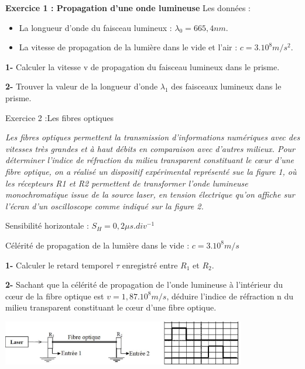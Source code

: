 \documentclass[12pt, french]{article}
\begin{document}
\begin{Box2}{\textbf{Exercice 1 : Propagation d’une onde lumineuse }}
Les données :

\begin{itemize}
	\item La longueur d’onde du faisceau lumineux : $\lambda_0=665,4nm$.

	\item La vitesse de propagation de la lumière dans le vide et l’air : $c=3.10^8m/s^2$.
\end{itemize}

\textbf{1- }Calculer la vitesse v de propagation du faisceau lumineux dans le prisme.

\textbf{2- }Trouver la valeur de la longueur d’onde $\lambda_1$ des faisceaux lumineux dans le prisme.

\end{Box2}
\begin{Box2}{Exercice 2 :Les fibres optiques  }

	\emph{Les fibres optiques permettent la transmission d’informations numériques avec des vitesses très
grandes et à haut débits en comparaison avec d’autres milieux.
Pour déterminer l’indice de réfraction du milieu transparent constituant le cœur d’une fibre optique,
on a réalisé un dispositif expérimental représenté sue la figure 1, où les récepteurs R1 et R2 permettent
de transformer l’onde lumineuse monochromatique issue de la source laser, en tension électrique qu’on
affiche sur l’écran d’un oscilloscope comme indiqué sur la figure 2.}

Sensibilité horizontale : $S_H = 0,2 \mu{s}.div^{-1}$

Célérité de propagation de la lumière dans le vide : $c = 3.10^8 m/s$ 

\textbf{1- }Calculer le retard temporel $\tau$ enregistré entre $R_1$ et $R_2$.

\textbf{2- }Sachant que la célérité de propagation de l’onde lumineuse à l’intérieur du cœur de la fibre
optique est $v = 1,87.10^8 m/s$, déduire l’indice de réfraction n du milieu transparent constituant
le cœur d’une fibre optique.
  \begin{center}
	\includegraphics[width=0.8\textwidth]{./img/ex2.png}
  \end{center}

\end{Box2}
\end{document}
